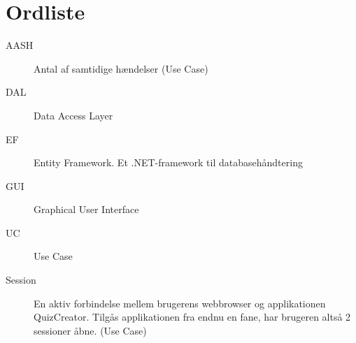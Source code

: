 \chapter{Ordliste}\label{head:ordliste}




\begin{description}
\item[AASH] Antal af samtidige hændelser (Use Case)
\item[DAL] Data Access Layer
\item[EF] Entity Framework. Et .NET-framework til databasehåndtering
\item[GUI] Graphical User Interface
\item[UC] Use Case
\item[Session] En aktiv forbindelse mellem brugerens webbrowser og applikationen QuizCreator. Tilgås applikationen fra endnu en fane, har brugeren altså 2 sessioner åbne. (Use Case)

\end{description}